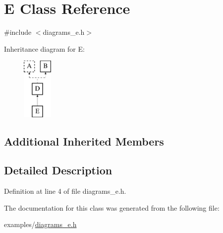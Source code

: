 \hypertarget{class_e}{}\section{E Class Reference}
\label{class_e}


{\ttfamily \#include $<$diagrams\+\_\+e.\+h$>$}

Inheritance diagram for E\+:\begin{figure}[H]
\begin{center}
\leavevmode
\includegraphics[height=3.000000cm]{class_e}
\end{center}
\end{figure}
\subsection*{Additional Inherited Members}


\subsection{Detailed Description}


Definition at line 4 of file diagrams\+\_\+e.\+h.



The documentation for this class was generated from the following file\+:\begin{DoxyCompactItemize}
\item 
examples/\mbox{\hyperlink{diagrams__e_8h}{diagrams\+\_\+e.\+h}}\end{DoxyCompactItemize}
